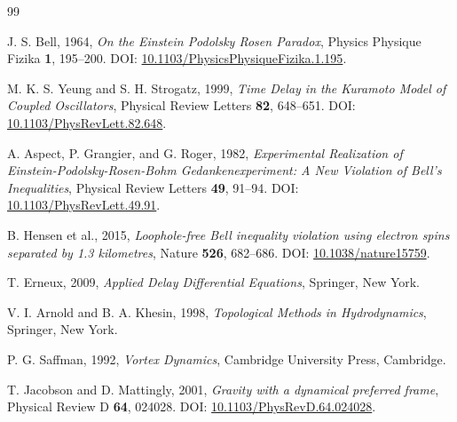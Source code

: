 \documentclass[11pt]{article}
\begin{document}
            \begin{thebibliography}{99}
                
                J. S. Bell, 1964,
                \textit{On the Einstein Podolsky Rosen Paradox},
                Physics Physique Fizika \textbf{1}, 195--200.
                DOI: \href{https://doi.org/10.1103/PhysicsPhysiqueFizika.1.195}{10.1103/PhysicsPhysiqueFizika.1.195}.

                M. K. S. Yeung and S. H. Strogatz, 1999,
                \textit{Time Delay in the Kuramoto Model of Coupled Oscillators},
                Physical Review Letters \textbf{82}, 648--651.
                DOI: \href{https://doi.org/10.1103/PhysRevLett.82.648}{10.1103/PhysRevLett.82.648}.
                
                A. Aspect, P. Grangier, and G. Roger, 1982,
                \textit{Experimental Realization of Einstein-Podolsky-Rosen-Bohm Gedankenexperiment: A New Violation of Bell's Inequalities},
                Physical Review Letters \textbf{49}, 91--94.
                DOI: \href{https://doi.org/10.1103/PhysRevLett.49.91}{10.1103/PhysRevLett.49.91}.
                
                B. Hensen et al., 2015,
                \textit{Loophole-free Bell inequality violation using electron spins separated by 1.3 kilometres},
                Nature \textbf{526}, 682--686.
                DOI: \href{https://doi.org/10.1038/nature15759}{10.1038/nature15759}.
                
                T. Erneux, 2009,
                \textit{Applied Delay Differential Equations},
                Springer, New York.
                
                V. I. Arnold and B. A. Khesin, 1998,
                \textit{Topological Methods in Hydrodynamics},
                Springer, New York.
                
                P. G. Saffman, 1992,
                \textit{Vortex Dynamics},
                Cambridge University Press, Cambridge.
                
                T. Jacobson and D. Mattingly, 2001,
                \textit{Gravity with a dynamical preferred frame},
                Physical Review D \textbf{64}, 024028.
                DOI: \href{https://doi.org/10.1103/PhysRevD.64.024028}{10.1103/PhysRevD.64.024028}.


\end{thebibliography}
\end{document}
